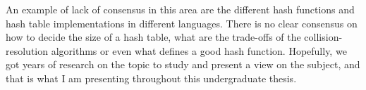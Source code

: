 An example of lack of consensus in this area are the different hash functions and hash table implementations in different languages. There is no clear consensus on how to decide the size of a hash table, what are the trade-offs of the collision-resolution algorithms or even what defines a good hash function. Hopefully, we got years of research on the topic to study and present a view on the subject, and that is what I am presenting throughout this undergraduate thesis.

